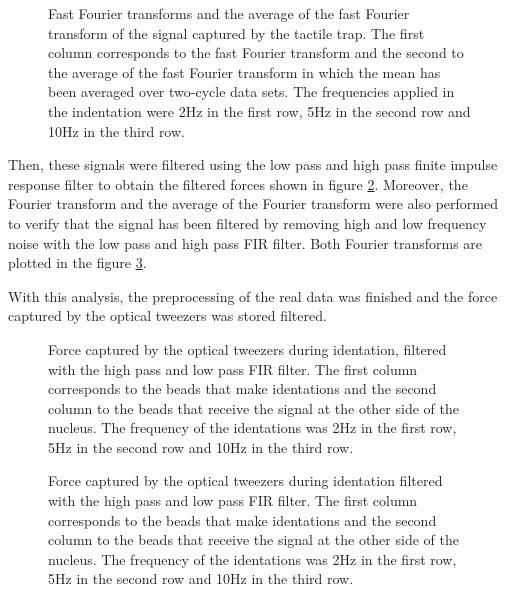 \documentclass[12pt, a4paper]{article} %
\begin{document}
\newpage

\begin{figure}[htbp]
  \centering
  
  \caption{Fast Fourier transforms and the average of the fast Fourier transform of the signal captured by the tactile trap. The first column corresponds to the fast Fourier transform and the second to the average of the fast Fourier transform in which the mean has been averaged over two-cycle data sets. The frequencies applied in the indentation were 2Hz in the first row, 5Hz in the second row and 10Hz in the third row.}
  \label{fig:fourier_sin_filtro}
\end{figure}

Then, these signals were filtered using the low pass and high pass finite impulse response filter to obtain the filtered forces shown in figure \ref{fig:filtered_data}. Moreover, the Fourier transform and the average of the Fourier transform were also performed to verify that the signal has been filtered by removing high and low frequency noise with the low pass and high pass FIR filter. Both Fourier transforms are plotted in the figure \ref{fig:fourier_con_filtro_todo}.

With this analysis, the preprocessing of the real data was finished and the force captured by the optical tweezers was stored filtered.

\newpage

\begin{figure}[htbp]
  \centering
  
  \caption{Force captured by the optical tweezers during identation, filtered with the high pass and low pass FIR filter. The first column corresponds to the beads that make identations and the second column to the beads that receive the signal at the other side of the nucleus. The frequency of the identations was 2Hz in the first row, 5Hz in the second row and 10Hz in the third row.}
  \label{fig:filtered_data}
\end{figure}

\begin{figure}[H]
    \centering
    
  \caption{Force captured by the optical tweezers during identation filtered with the high pass and low pass FIR filter. The first column corresponds to the beads that make identations and the second column to the beads that receive the signal at the other side of the nucleus. The frequency of the identations was 2Hz in the first row, 5Hz in the second row and 10Hz in the third row.}
  \label{fig:fourier_con_filtro_todo}
\end{figure}
\end{document}
